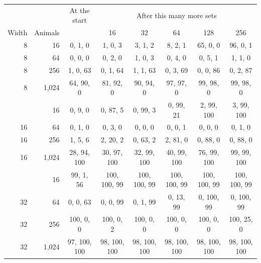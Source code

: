 \begin{tabular}{@{}rrcccccc@{}}
\toprule
 & & At the start & \multicolumn{5}{c}{After this many more sets} \\
Width & Animals & & 16 & 32 & 64 & 128 & 256 \\
\midrule
8 & 16 & 0, 1, 0 & 1, 0, 3 & 3, 1, 2 & 8, 2, 1 & 65, 0, 0 & 96, 0, 1 \\
8 & 64 & 0, 0, 0 & 0, 2, 0 & 1, 0, 3 & 0, 4, 0 & 0, 5, 1 & 1, 1, 0 \\
8 & 256 & 1, 0, 63 & 0, 1, 64 & 1, 1, 63 & 0, 3, 69 & 0, 0, 86 & 0, 2, 87 \\
8 & 1{,}024 & 64, 90, 0 & 81, 92, 0 & 90, 94, 0 & 97, 97, 0 & 99, 98, 0 & 99, 98, 0 \\
\addlinespace[3pt]
16 & 16 & 0, 9, 0 & 0, 87, 5 & 0, 99, 3 & 0, 99, 21 & 2, 99, 100 & 3, 99, 100 \\
16 & 64 & 0, 1, 0 & 0, 3, 0 & 0, 0, 0 & 0, 0, 1 & 0, 0, 0 & 0, 1, 0 \\
16 & 256 & 1, 5, 6 & 2, 20, 2 & 0, 63, 2 & 2, 81, 0 & 0, 88, 0 & 0, 88, 0 \\
16 & 1{,}024 & 28, 94, 100 & 30, 97, 100 & 32, 99, 100 & 40, 99, 100 & 76, 99, 100 & 99, 99, 100 \\
\addlinespace[3pt]
32 & 16 & 99, 1, 56 & 100, 100, 99 & 100, 100, 99 & 100, 100, 99 & 100, 100, 99 & 100, 100, 99 \\
32 & 64 & 0, 0, 63 & 0, 0, 99 & 0, 1, 99 & 0, 13, 99 & 0, 100, 99 & 0, 100, 99 \\
32 & 256 & 100, 0, 0 & 100, 0, 2 & 100, 0, 0 & 100, 0, 0 & 100, 0, 0 & 100, 25, 0 \\
32 & 1{,}024 & 97, 100, 100 & 98, 100, 100 & 98, 100, 100 & 98, 100, 100 & 98, 100, 100 & 98, 100, 100 \\
\bottomrule
\end{tabular}
